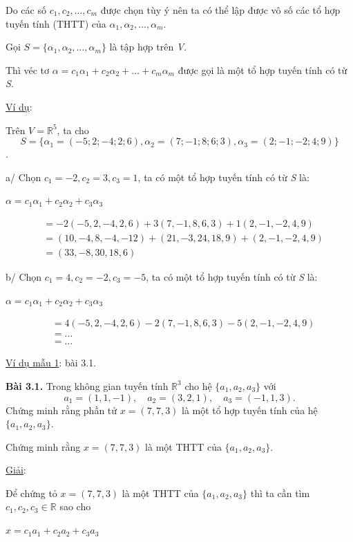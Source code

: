 \documentclass[12pt,a4paper]{article}
\begin{document}
Do các số $c_1, c_2, \dots, c_m$ được
chọn tùy ý nên ta có thể lập được vô số các tổ hợp tuyến tính (THTT) của
$\alpha_1, \alpha_2, \dots, \alpha_m$.

Gọi $S = \{\alpha_1, \alpha_2, \dots, \alpha_m\}$ là tập hợp
trên \emph{V}.

Thì véc tơ $\alpha = c_1\alpha_1 + c_2\alpha_2 + \dots + c_m\alpha_m$
được gọi là một tổ hợp tuyến tính có từ \emph{S}.

\ul{Ví dụ}:

Trên $V = \mathbb{R}^5$, ta cho
\[ S = \{\alpha_1 = (-5; 2; -4; 2; 6), \alpha_2 = (7; -1; 8; 6; 3), \alpha_3 = (2; -1; -2; 4; 9)\} \].

a/ Chọn $c_1 = -2, c_2 = 3, c_3 = 1$, ta có
một tổ hợp tuyến tính có từ \emph{S} là:

$\alpha = c_1\alpha_1 + c_2\alpha_2 + c_3\alpha_3$

\begin{align*}
 &= -2(-5, 2, -4, 2, 6) + 3(7, -1, 8, 6, 3) + 1(2, -1, -2, 4, 9) \\ &= (10, -4, 8, -4, -12) + (21, -3, 24, 18, 9) + (2, -1, -2, 4, 9) \\ &= (33, -8, 30, 18, 6) 
\end{align*}

b/ Chọn $c_1 = 4, c_2 = -2, c_3 = -5$, ta có
một tổ hợp tuyến tính có từ \emph{S} là:

$\alpha = c_1\alpha_1 + c_2\alpha_2 + c_3\alpha_3$

\begin{align*}
 &= 4(-5, 2, -4, 2, 6) - 2(7, -1, 8, 6, 3) - 5(2, -1, -2, 4, 9) \\ &= \dots \\ &= \dots 
\end{align*}

\ul{Ví dụ mẫu 1}: bài 3.1.

\textbf{Bài 3.1.} Trong không gian tuyến tính $\mathbb{R}^3$ cho hệ $\{a_1, a_2, a_3\}$ với \[ a_1 = (1, 1, -1), \quad a_2 = (3, 2, 1), \quad a_3 = (-1, 1, 3). \] Chứng minh rằng phần tử $x = (7, 7, 3)$ là một tổ hợp tuyến tính của hệ $\{a_1, a_2, a_3\}$.

Chứng minh rằng
$x = (7, 7, 3)$ là một THTT
của $\{a_1, a_2, a_3\}$.

\ul{Giải}:

Để chứng tỏ $x = (7, 7, 3)$ là
một THTT của $\{a_1, a_2, a_3\}$
thì ta cần tìm $c_1, c_2, c_3 \in \mathbb{R}$
sao cho

$x = c_1a_1 + c_2a_2 + c_3a_3$
\end{document}
